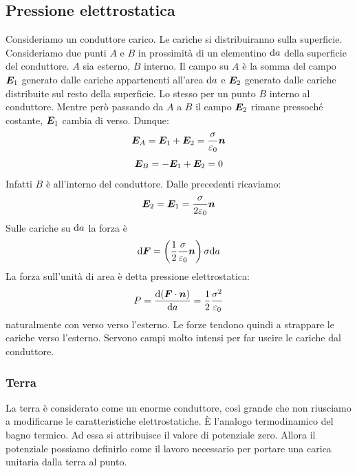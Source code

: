 \subsection{Pressione elettrostatica}
Consideriamo un conduttore carico. Le cariche si distribuiranno sulla superficie. Consideriamo due punti $A$ e $B$ in prossimità di un elementino $\mathrm{d} a$ della superficie del conduttore. $A$ sia esterno, $B$ interno. Il campo su $A$ è la somma del campo $\boldsymbol{E}_1$ generato dalle cariche appartenenti all'area $\mathrm{d} a$ e $\boldsymbol{E}_2$ generato dalle cariche distribuite sul resto della superficie. Lo stesso per un punto $B$ interno al conduttore. Mentre però passando da $A$ a $B$ il campo $\boldsymbol{E}_2$ rimane pressoché costante, $\boldsymbol{E}_1$ cambia di verso. Dunque:
\begin{equation*}\boldsymbol{E}_A=\boldsymbol{E}_1+\boldsymbol{E}_2=\frac{\sigma}{\varepsilon_0}\boldsymbol{n}\end{equation*}
\begin{equation*}\boldsymbol{E}_B=-\boldsymbol{E}_1+\boldsymbol{E}_2=0\end{equation*}
Infatti $B$ è all'interno del conduttore. Dalle precedenti ricaviamo:
\begin{equation*}\boldsymbol{E}_2=\boldsymbol{E}_1=\frac{\sigma}{2\varepsilon_0}\boldsymbol{n}\end{equation*}
Sulle cariche su $\mathrm{d} a$ la forza è 
\begin{equation*}\mathrm{d} \boldsymbol{F}=\left(\frac{1}{2}\frac{\sigma}{\varepsilon_0}\boldsymbol{n}\right)\sigma\mathrm{d} a\end{equation*}
La forza sull'unità di area è detta pressione elettrostatica:
\begin{equation}
P=\frac{\mathrm{d}(\boldsymbol{F}\cdot \boldsymbol{n})}{\mathrm{d} a}=\frac{1}{2}\frac{\sigma^2}{\varepsilon_0}
\end{equation}
naturalmente con verso verso l'esterno. Le forze tendono quindi a strappare le cariche verso l'esterno. Servono campi molto intensi per far uscire le cariche dal conduttore.
\subsubsection{Terra}
\label{potenziale_terra}
La terra è considerato come un enorme conduttore, così grande che non riusciamo a modificarne le caratteristiche elettrostatiche. \`E l'analogo termodinamico del bagno termico. Ad essa si attribuisce il valore di potenziale zero. Allora il potenziale possiamo definirlo come il lavoro necessario per portare una carica unitaria dalla terra al punto.
